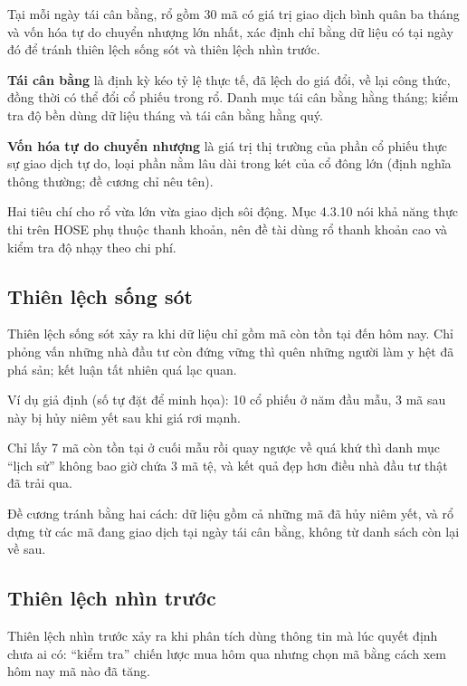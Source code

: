 Tại mỗi ngày tái cân bằng, rổ gồm 30 mã có giá trị giao dịch bình quân ba tháng và vốn hóa tự do chuyển nhượng lớn nhất, xác định chỉ bằng dữ liệu có tại ngày đó để tránh thiên lệch sống sót và thiên lệch nhìn trước.

\textbf{Tái cân bằng} là định kỳ kéo tỷ lệ thực tế, đã lệch do giá đổi, về lại công thức, đồng thời có thể đổi cổ phiếu trong rổ. Danh mục tái cân bằng hằng tháng; kiểm tra độ bền dùng dữ liệu tháng và tái cân bằng hằng quý.

\textbf{Vốn hóa tự do chuyển nhượng} là giá trị thị trường của phần cổ phiếu thực sự giao dịch tự do, loại phần nằm lâu dài trong két của cổ đông lớn (định nghĩa thông thường; đề cương chỉ nêu tên).

Hai tiêu chí cho rổ vừa lớn vừa giao dịch sôi động. Mục 4.3.10 nói khả năng thực thi trên HOSE phụ thuộc thanh khoản, nên đề tài dùng rổ thanh khoản cao và kiểm tra độ nhạy theo chi phí.

\subsection{Thiên lệch sống sót}

Thiên lệch sống sót xảy ra khi dữ liệu chỉ gồm mã còn tồn tại đến hôm nay. Chỉ phỏng vấn những nhà đầu tư còn đứng vững thì quên những người làm y hệt đã phá sản; kết luận tất nhiên quá lạc quan.

\begin{tcolorbox}[breakable]
Ví dụ giả định (số tự đặt để minh họa): 10 cổ phiếu ở năm đầu mẫu, 3 mã sau này bị hủy niêm yết sau khi giá rơi mạnh.

Chỉ lấy 7 mã còn tồn tại ở cuối mẫu rồi quay ngược về quá khứ thì danh mục “lịch sử” không bao giờ chứa 3 mã tệ, và kết quả đẹp hơn điều nhà đầu tư thật đã trải qua.
\end{tcolorbox}

Đề cương tránh bằng hai cách: dữ liệu gồm cả những mã đã hủy niêm yết, và rổ dựng từ các mã đang giao dịch tại ngày tái cân bằng, không từ danh sách còn lại về sau.

\subsection{Thiên lệch nhìn trước}

Thiên lệch nhìn trước xảy ra khi phân tích dùng thông tin mà lúc quyết định chưa ai có: “kiểm tra” chiến lược mua hôm qua nhưng chọn mã bằng cách xem hôm nay mã nào đã tăng.

